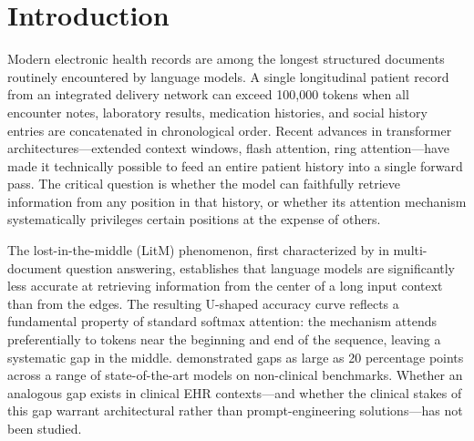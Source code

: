 \documentclass{article}
\begin{document}
\begin{abstract}
$k{=}20$, BM25 retrieves the gold-standard evidence sentence in 98.8\% of test
instructions (QCCS: 34.9\%); cross-encoder reranking achieves 96.4\% overall;
dense retrieval 94.0\%. A conditional accuracy analysis reveals that Stage-2
accuracy remains $\leq$2.6\% for all retrieval-based comparators even in the
74--82 instructions where those arms successfully retrieve the gold-evidence
sentence (by lexical overlap), while QCCS achieves 25.0\% accuracy in the 52 of
83 instructions where it does \emph{not} retrieve the gold sentence---establishing
that \textbf{in this proof-of-concept evaluation, query-aligned context selection
is a stronger predictor of EHR instruction-following accuracy than
gold-sentence retrieval recall}. A no-query ablation confirms
that query conditioning accounts for +23.8 percentage points of middle-position
recall.
Code is available at \texttt{[anonymized for review]}.
\end{abstract}

\section{Introduction}
\label{sec:intro}

Modern electronic health records are among the longest structured documents
routinely encountered by language models. A single longitudinal patient record
from an integrated delivery network can exceed 100,000 tokens when all encounter
notes, laboratory results, medication histories, and social history entries are
concatenated in chronological order. Recent advances in transformer
architectures---extended context windows, flash attention, ring
attention---have made it technically possible to feed an entire patient history
into a single forward pass. The critical question is whether the model can
faithfully retrieve information from any position in that history, or whether its
attention mechanism systematically privileges certain positions at the expense of
others.

The lost-in-the-middle (LitM) phenomenon, first characterized by
\citet{liu2024lost} in multi-document question answering, establishes that
language models are significantly less accurate at retrieving information from
the center of a long input context than from the edges. The resulting U-shaped
accuracy curve reflects a fundamental property of standard softmax attention:
the mechanism attends preferentially to tokens near the beginning and end of
the sequence, leaving a systematic gap in the middle.
\citet{liu2024lost} demonstrated gaps as large as 20 percentage points across a
range of state-of-the-art models on non-clinical benchmarks. Whether an
analogous gap exists in clinical EHR contexts---and whether the clinical stakes
of this gap warrant architectural rather than prompt-engineering
solutions---has not been studied.
\end{document}
